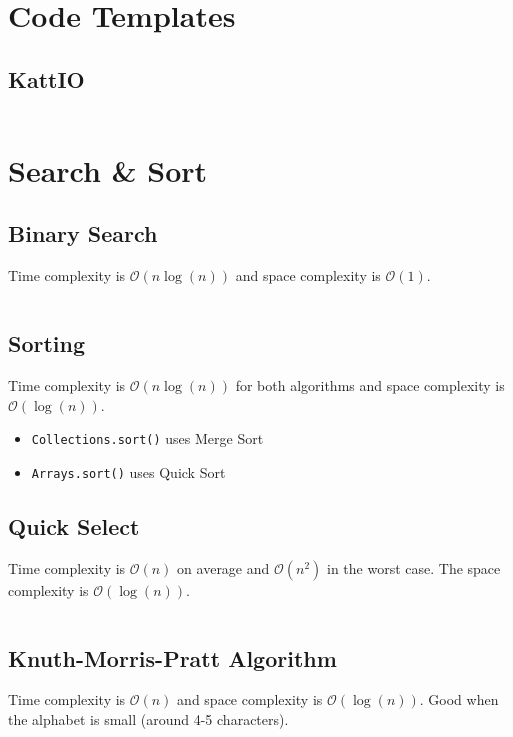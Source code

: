 \documentclass[8pt,a4paper,landscape,oneside]{amsart}
\newcommand{\code}[1]{\inputminted[fontsize=\normalsize,baselinestretch=1]{java}{code/#1}}
\newcommand{\bigO}{\mathcal{O}}
\begin{document}
\begin{multicols*}{3}
\thispagestyle{fancy}
\vspace{-3em}

\tableofcontents
\section{Code Templates}
  \subsection{KattIO}
  \code{Kattio.java}
  
  
\section{Search \& Sort}
  \subsection{Binary Search}
  Time complexity is $\bigO(n \log(n))$ and space complexity is $\bigO(1)$.
  \code{Structures/BinarySearch.java}
  \subsection{Sorting}
  Time complexity is $\bigO(n \log(n))$ for both algorithms and space complexity is $\bigO(\log(n))$.
  \begin{itemize}
  \item \texttt{Collections.sort()} uses Merge Sort
  \item \texttt{Arrays.sort()} uses Quick Sort
  \end{itemize}
  
  \subsection{Quick Select}
  Time complexity is $\bigO(n)$ on average and $\bigO(n^2)$ in the worst case. The space complexity is $\bigO(\log(n))$.
  \code{Structures/QuickSelect.java}
  
  \subsection{Knuth-Morris-Pratt Algorithm}
  Time complexity is $\bigO(n)$ and space complexity is $\bigO(\log(n))$. Good when the alphabet is small (around 4-5 characters).
  \code{Structures/KMP.java}
  

\end{multicols*}
\end{document}
